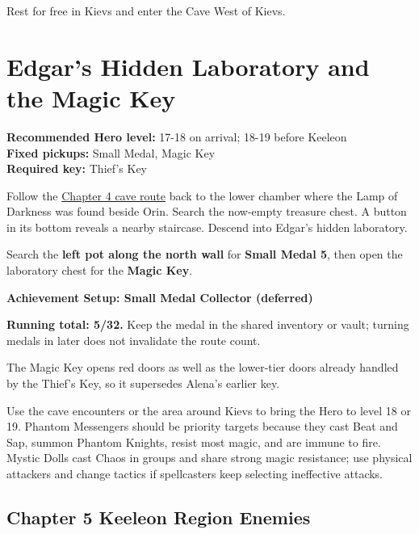 \documentclass[
  american,
  10pt,
  letterpaper,
  oneside,
  open=any]{scrreprt}
\begin{document}
Rest for free in Kievs and enter the Cave West of Kievs.

\section{Edgar's Hidden Laboratory and the Magic
Key}\label{edgars-hidden-laboratory-and-the-magic-key}

\textbf{Recommended Hero level:} 17-18 on arrival; 18-19 before
Keeleon\\
\textbf{Fixed pickups:} Small Medal, Magic Key\\
\textbf{Required key:} Thief's Key

Follow the \hyperref[cave-west-of-kievs]{Chapter 4 cave route} back to
the lower chamber where the Lamp of Darkness was found beside Orin.
Search the now-empty treasure chest. A button in its bottom reveals a
nearby staircase. Descend into Edgar's hidden laboratory.

Search the \textbf{left pot along the north wall} for \textbf{Small
Medal 5}, then open the laboratory chest for the \textbf{Magic Key}.

\begin{achievementsetup}

\textbf{Achievement Setup: Small Medal Collector (deferred)}

\textbf{Running total: 5/32.} Keep the medal in the shared inventory or
vault; turning medals in later does not invalidate the route count.

\end{achievementsetup}

The Magic Key opens red doors as well as the lower-tier doors already
handled by the Thief's Key, so it supersedes Alena's earlier key.

Use the cave encounters or the area around Kievs to bring the Hero to
level 18 or 19. Phantom Messengers should be priority targets because
they cast Beat and Sap, summon Phantom Knights, resist most magic, and
are immune to fire. Mystic Dolls cast Chaos in groups and share strong
magic resistance; use physical attackers and change tactics if
spellcasters keep selecting ineffective attacks.

\subsection{Chapter 5 Keeleon Region
Enemies}\label{chapter-5-keeleon-region-enemies}
\end{document}
